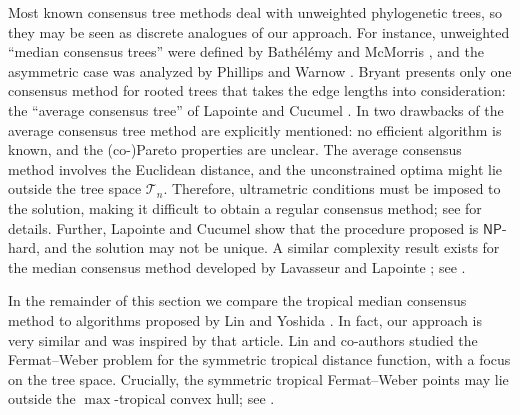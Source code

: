 \documentclass[a4paper,12pt]{amsart}
\newcommand\cT{{\mathcal T}}
\theoremstyle{remark}
\begin{document}
Most known consensus tree methods deal with unweighted phylogenetic trees, so they may be seen as discrete analogues of our approach.
For instance, unweighted \enquote{median consensus trees} were defined by Bath\'el\'emy and McMorris \cite{MedianTree}, and the asymmetric case was analyzed by Phillips and Warnow \cite{AsymmMedianTree}.
Bryant \cite{Bryant:2003} presents only one consensus method for rooted trees that takes the edge lengths into consideration: the \enquote{average consensus tree} of Lapointe and Cucumel \cite{AvgConsensus}.
In \cite[\S2.4.2]{Bryant:2003} two drawbacks of the average consensus tree method are explicitly mentioned: no efficient algorithm is known, and the (co-)Pareto properties are unclear.
The average consensus method involves the Euclidean distance, and the unconstrained optima might lie outside the tree space $\cT_n$.
Therefore, ultrametric conditions must be imposed to the solution, making it difficult to obtain a regular consensus method; see \cite{AvgConsensus} for details.
Further, Lapointe and Cucumel \cite{Lapointe+Cucumel:2002} show that the procedure proposed is $\mathsf{NP}$-hard, and the solution may not be unique.
A similar complexity result exists for the median consensus method developed by Lavasseur and Lapointe \cite{Levasseur+Lapointe:2002}; see \cite{Day:87}.

In the remainder of this section we compare the tropical median consensus method to algorithms proposed by Lin and Yoshida \cite{Lin-Yoshida:2018}.
In fact, our approach is very similar and was inspired by that article.
Lin and co-authors \cite{ConvTreeSp} studied the Fermat--Weber problem for the symmetric tropical distance function, with a focus on the tree space.
Crucially, the symmetric tropical Fermat--Weber points may lie outside the $\max$-tropical convex hull; see \cite[Example~27]{ConvTreeSp}.
\end{document}
